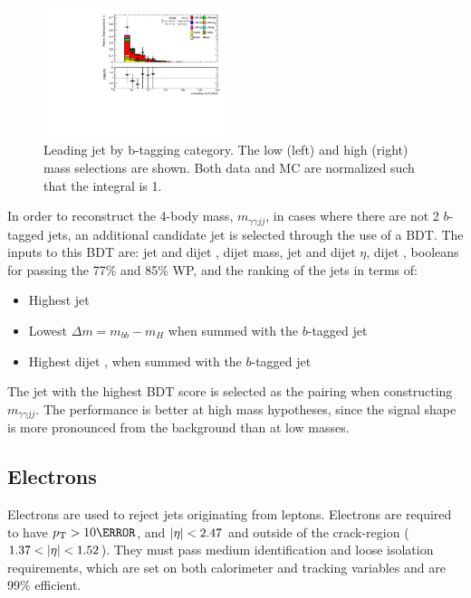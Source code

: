 \begin{figure}[htbp]
  \includegraphics[width=0.48\textwidth]{chapters/chapter5_yybb/images/data_MC_comparison/h_SR_h_2t_nominal_subleadingJet_pt.pdf}
  \caption[Subleading jet \pt.]{Leading jet \pt by b-tagging category. The low (left) and high (right) mass selections are shown. Both data and MC are normalized such that the integral is 1.
  \label{fig:jet_s_pt}}
\end{figure}


In order to reconstruct the 4-body mass, $m_{\gamma\gamma jj}$, in cases where there are not 2 $b$-tagged jets, an additional candidate jet is selected through the use of a \gls{BDT}. The inputs to this \gls{BDT} are: jet and dijet \pt, dijet mass, jet and dijet $\eta$, dijet \Deta, booleans for passing the 77\% and 85\% \btagging WP, and the ranking of the jets in terms of:

\begin{itemize}
  \item Highest jet \pt
  \item Lowest $\Delta m = m_{bb} - m_H$ when summed with the $b$-tagged jet
  \item Highest dijet \pt, when summed with the $b$-tagged jet
\end{itemize}

The jet with the highest \gls{BDT} score is selected as the pairing when constructing  $m_{\gamma\gamma jj}$. The performance is better at high mass hypotheses, since the signal shape is more pronounced from the background than at low masses. 


\subsection{Electrons}

Electrons are used to reject jets originating from leptons. Electrons are required to have $\pt > \unit{10}{\GeV}$, and $|\eta| < 2.47$ and outside of the crack-region ($1.37 < |\eta| < 1.52$). They must pass medium identification and loose isolation requirements, which are set on both calorimeter and tracking variables and are 99\% efficient.

